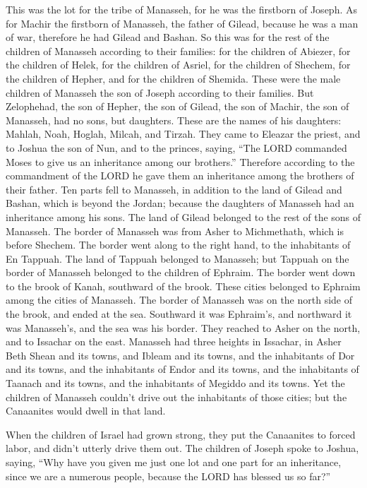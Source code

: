 \mychapter{} \myverse*{}This was the lot for the tribe of Manasseh, for he was the firstborn
of Joseph. As for Machir the firstborn of Manasseh, the father of Gilead, because he was a man of war,
therefore he had Gilead and Bashan.
\myverse{}So this was for the rest of the children of Manasseh according to their families:
for the children of Abiezer, for the children of Helek, for the children of Asriel, for the children of
Shechem, for the children of Hepher, and for the children of Shemida. These were the male children of
Manasseh the son of Joseph according to their families.
\myverse{}But Zelophehad, the son of Hepher, the son of Gilead, the son of Machir, the
son of Manasseh, had no sons, but daughters. These are the names of his daughters: Mahlah, Noah, Hoglah,
Milcah, and Tirzah.
\myverse{}They came to Eleazar the priest, and to Joshua the son of Nun, and to the princes,
saying, “The LORD commanded Moses to give us an inheritance among our brothers.” Therefore according to
the commandment of the LORD he gave them an inheritance among the brothers of their father.
\myverse{}Ten parts fell to Manasseh, in addition to the land of Gilead and Bashan, which
is beyond the Jordan;
\myverse{}because the daughters of Manasseh had an inheritance among his sons. The land
of Gilead belonged to the rest of the sons of Manasseh.
\myverse{}The border of Manasseh was from Asher to Michmethath, which is before Shechem.
The border went along to the right hand, to the inhabitants of En Tappuah.
\myverse{}The land of Tappuah belonged to Manasseh; but Tappuah on the border of Manasseh
belonged to the children of Ephraim.
\myverse{}The border went down to the brook of Kanah, southward of the brook. These cities
belonged to Ephraim among the cities of Manasseh. The border of Manasseh was on the north side of the
brook, and ended at the sea.
\myverse{}Southward it was Ephraim’s, and northward it was Manasseh’s, and the sea
was his border. They reached to Asher on the north, and to Issachar on the east.
\myverse{}Manasseh had three heights in Issachar, in Asher Beth Shean and its towns,
and Ibleam and its towns, and the inhabitants of Dor and its towns, and the inhabitants of Endor and its
towns, and the inhabitants of Taanach and its towns, and the inhabitants of Megiddo and its towns.
\myverse{}Yet the children of Manasseh couldn’t drive out the inhabitants of those
cities; but the Canaanites would dwell in that land.

\myverse{}When the children of Israel had grown strong, they put the Canaanites
to forced labor, and didn’t utterly drive them out.
\myverse{}The children of Joseph spoke to Joshua, saying, “Why have you given me just
one lot and one part for an inheritance, since we are a numerous people, because the LORD has blessed
us so far?”

